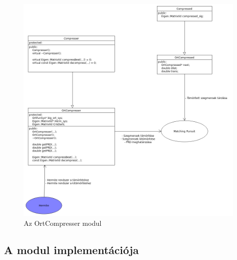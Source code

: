 \documentclass[oneside,titlepage,12pt,a4paper]{report}
\begin{document}
\begin{figure}[H] \label{OrtCompresserUML}
\begin{center}
  \includegraphics[width=150mm]{./Abrak/UML/OrtCompresser.png}
  \caption{Az OrtCompresser modul}
\end{center}
\end{figure}  

\subsection*{A modul implementációja}
\end{document}
